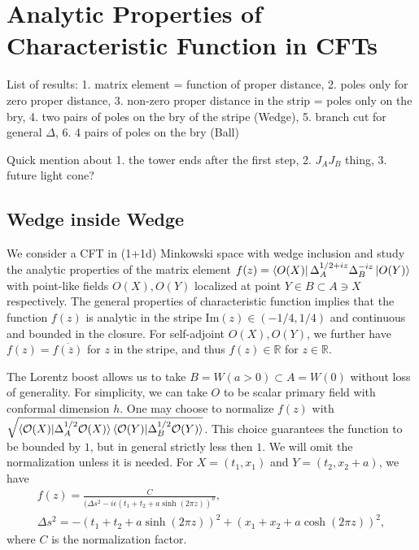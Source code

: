 \documentclass[a4paper,11pt]{article}
\theoremstyle{definition}
\newcommand{\mO}{\mathcal{O}}
\begin{document}
\section{Analytic Properties of Characteristic Function in CFTs}
List of results: 1. matrix element = function of proper distance, 2. poles only for zero proper distance, 3. non-zero proper distance in the strip = poles only on the bry, 4. two pairs of poles on the bry of the stripe (Wedge), 5. branch cut for general $\Delta$, 6. 4 pairs of poles on the bry (Ball)

Quick mention about 1. the tower ends after the first step, 2. $J_AJ_B$ thing, 3. future light cone?
\subsection{Wedge inside Wedge}
We consider a CFT in (1+1d) Minkowski space with wedge inclusion and study the analytic properties of the matrix element $f(z)=\bra{O(X)}\Delta_A^{1/2+iz}\Delta_B^{-iz}\ket{O(Y)}$ with point-like fields $O(X), O(Y)$ localized at point $Y\in B \subset A\ni X$ respectively. The general properties of characteristic function implies that the function $f(z)$ is analytic in the stripe Im$(z)\in (-1/4,1/4)$ and continuous and bounded in the closure. For self-adjoint $O(X), O(Y)$, we further have $f(z) = \overline{f(\overline{z})}$ for $z$ in the stripe, and thus $f(z)\in\mathbb{R}$ for $z\in\mathbb{R}$.

The Lorentz boost allows us to take $B = W(a>0) \subset A = W(0)$ without loss of generality. For simplicity, we can take $O$ to be scalar primary field with conformal dimension $h$. One may choose to normalize $f(z)$ with $\sqrt{\braket{\mO(X)|\Delta_A^{1/2}\mO(X)}\braket{\mO(Y)|\Delta_B^{1/2}\mO(Y)}}$. This choice guarantees the function to be bounded by $1$, but in general strictly less then $1$. We will omit the normalization unless it is needed. For $X = (t_1,x_1)$ and $Y = (t_2,x_2+a)$, we have
\begin{gather}
    f(z) = \frac{C}{(\Delta s^2-i\epsilon(t_1+t_2+a\sinh(2\pi z))^{h}},\nonumber\\
    \Delta s^2 = -(t_1+t_2+a\sinh(2\pi z))^2 + (x_1+x_2 + a\cosh(2\pi z))^2,
\end{gather}
where $C$ is the normalization factor. 
\end{document}
